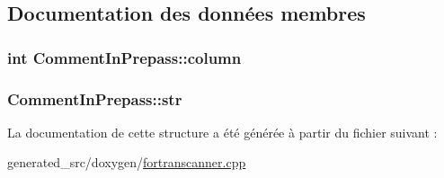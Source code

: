\subsection{Documentation des données membres}
\hypertarget{struct_comment_in_prepass_a84b0d18b00f30aa819ec490f79e24018}{}
\subsubsection[{column}]{\setlength{\rightskip}{0pt plus 5cm}int Comment\+In\+Prepass\+::column}\label{struct_comment_in_prepass_a84b0d18b00f30aa819ec490f79e24018}
\hypertarget{struct_comment_in_prepass_a121d4cd80b9102d3c562acbef48952ca}{}
\subsubsection[{str}]{ Comment\+In\+Prepass\+::str}\label{struct_comment_in_prepass_a121d4cd80b9102d3c562acbef48952ca}


La documentation de cette structure a été générée à partir du fichier suivant \+:\begin{DoxyCompactItemize}
\item 
generated\+\_\+src/doxygen/\hyperlink{fortranscanner_8cpp}{fortranscanner.\+cpp}\end{DoxyCompactItemize}
